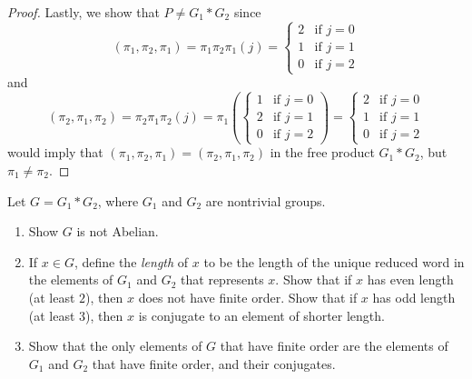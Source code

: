 \begin{proof}
Lastly, we show that $P\neq G_1*G_2$ since
\[
(\pi_1,\pi_2,\pi_1)=
\pi_1\pi_2\pi_1(j)=
\begin{cases}
2&\text{if $j=0$}\\
1&\text{if $j=1$}\\
0&\text{if $j=2$}
\end{cases}
\]
and
\[
(\pi_2,\pi_1,\pi_2)=
\pi_2\pi_1\pi_2(j)=
\pi_1\left(
\begin{cases}
1&\text{if $j=0$}\\
2&\text{if $j=1$}\\
0&\text{if $j=2$}
\end{cases}
\right)
=
\begin{cases}
2&\text{if $j=0$}\\
1&\text{if $j=1$}\\
0&\text{if $j=2$}
\end{cases}
\]
would imply that $(\pi_1,\pi_2,\pi_1)=(\pi_2,\pi_1,\pi_2)$ in the free
product $G_1*G_2$, but $\pi_1\neq\pi_2$.
\end{proof}
\newpage
\begin{problem}[Munkres \S68, Ex.\,2(a,b,c)]
Let $G=G_1*G_2$, where $G_1$ and $G_2$ are nontrivial groups.
\begin{enumerate}[label=(\alph*)]
\item Show $G$ is not Abelian.
\item If $x\in G$, define the \emph{length} of $x$ to be the length of the
  unique reduced word in the elements of $G_1$ and $G_2$ that represents
  $x$. Show that if $x$ has even length (at least $2$), then $x$ does not
  have finite order. Show that if $x$ has odd length (at least $3$), then
  $x$ is conjugate to an element of shorter length.
\item Show that the only elements of $G$ that have finite order are the
  elements of $G_1$ and $G_2$ that have finite order, and their
  conjugates.
\end{enumerate}
\end{problem}
